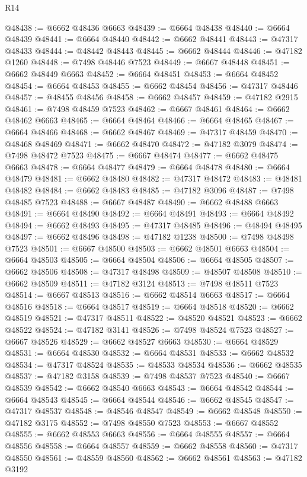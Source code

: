 \begin{lexlean}{R14}
\begin{coremodule}
@48438 := @6662 @48436 @6663
@48439 := @6664 @48438
@48440 := @6664 @48439
@48441 := @6664 @48440
@48442 := @6662 @48441
@48443 := @47317 @48433
@48444 := @48442 @48443
@48445 := @6662 @48444
@48446 := @47182 @1260
@48448 := @7498 @48446 @7523
@48449 := @6667 @48448
@48451 := @6662 @48449 @6663
@48452 := @6664 @48451
@48453 := @6664 @48452
@48454 := @6664 @48453
@48455 := @6662 @48454
@48456 := @47317 @48446
@48457 := @48455 @48456
@48458 := @6662 @48457
@48459 := @47182 @2915
@48461 := @7498 @48459 @7523
@48462 := @6667 @48461
@48464 := @6662 @48462 @6663
@48465 := @6664 @48464
@48466 := @6664 @48465
@48467 := @6664 @48466
@48468 := @6662 @48467
@48469 := @47317 @48459
@48470 := @48468 @48469
@48471 := @6662 @48470
@48472 := @47182 @3079
@48474 := @7498 @48472 @7523
@48475 := @6667 @48474
@48477 := @6662 @48475 @6663
@48478 := @6664 @48477
@48479 := @6664 @48478
@48480 := @6664 @48479
@48481 := @6662 @48480
@48482 := @47317 @48472
@48483 := @48481 @48482
@48484 := @6662 @48483
@48485 := @47182 @3096
@48487 := @7498 @48485 @7523
@48488 := @6667 @48487
@48490 := @6662 @48488 @6663
@48491 := @6664 @48490
@48492 := @6664 @48491
@48493 := @6664 @48492
@48494 := @6662 @48493
@48495 := @47317 @48485
@48496 := @48494 @48495
@48497 := @6662 @48496
@48498 := @47182 @1238
@48500 := @7498 @48498 @7523
@48501 := @6667 @48500
@48503 := @6662 @48501 @6663
@48504 := @6664 @48503
@48505 := @6664 @48504
@48506 := @6664 @48505
@48507 := @6662 @48506
@48508 := @47317 @48498
@48509 := @48507 @48508
@48510 := @6662 @48509
@48511 := @47182 @3124
@48513 := @7498 @48511 @7523
@48514 := @6667 @48513
@48516 := @6662 @48514 @6663
@48517 := @6664 @48516
@48518 := @6664 @48517
@48519 := @6664 @48518
@48520 := @6662 @48519
@48521 := @47317 @48511
@48522 := @48520 @48521
@48523 := @6662 @48522
@48524 := @47182 @3141
@48526 := @7498 @48524 @7523
@48527 := @6667 @48526
@48529 := @6662 @48527 @6663
@48530 := @6664 @48529
@48531 := @6664 @48530
@48532 := @6664 @48531
@48533 := @6662 @48532
@48534 := @47317 @48524
@48535 := @48533 @48534
@48536 := @6662 @48535
@48537 := @47182 @3158
@48539 := @7498 @48537 @7523
@48540 := @6667 @48539
@48542 := @6662 @48540 @6663
@48543 := @6664 @48542
@48544 := @6664 @48543
@48545 := @6664 @48544
@48546 := @6662 @48545
@48547 := @47317 @48537
@48548 := @48546 @48547
@48549 := @6662 @48548
@48550 := @47182 @3175
@48552 := @7498 @48550 @7523
@48553 := @6667 @48552
@48555 := @6662 @48553 @6663
@48556 := @6664 @48555
@48557 := @6664 @48556
@48558 := @6664 @48557
@48559 := @6662 @48558
@48560 := @47317 @48550
@48561 := @48559 @48560
@48562 := @6662 @48561
@48563 := @47182 @3192

\end{coremodule}
\end{lexlean}
